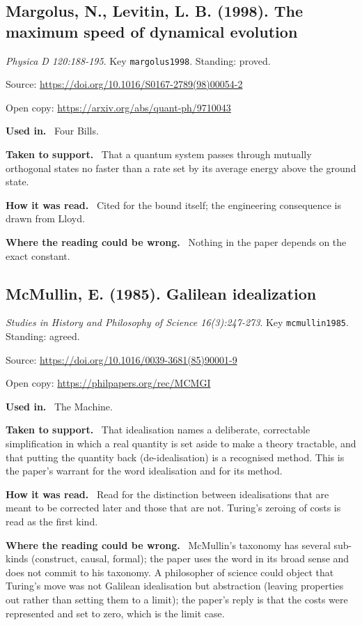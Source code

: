 \documentclass[11pt,oneside]{article}
\newcommand{\field}[1]{\par\noindent\textbf{\color{accent}#1.}\ }
\begin{document}
\subsection*{Margolus, N., Levitin, L. B. (1998). The maximum speed of dynamical evolution}
\noindent\small\emph{Physica D 120:188-195}. Key \texttt{margolus1998}. Standing: proved.
\par\noindent\small Source: \url{https://doi.org/10.1016/S0167-2789(98)00054-2}
\par\noindent\small Open copy: \url{https://arxiv.org/abs/quant-ph/9710043}
\normalsize
\field{Used in} Four Bills.
\field{Taken to support} That a quantum system passes through mutually orthogonal states no faster than a rate set by its average energy above the ground state.
\field{How it was read} Cited for the bound itself; the engineering consequence is drawn from Lloyd.
\field{Where the reading could be wrong} Nothing in the paper depends on the exact constant.

\hypertarget{src:mcmullin1985}{}
\subsection*{McMullin, E. (1985). Galilean idealization}
\noindent\small\emph{Studies in History and Philosophy of Science 16(3):247-273}. Key \texttt{mcmullin1985}. Standing: agreed.
\par\noindent\small Source: \url{https://doi.org/10.1016/0039-3681(85)90001-9}
\par\noindent\small Open copy: \url{https://philpapers.org/rec/MCMGI}
\normalsize
\field{Used in} The Machine.
\field{Taken to support} That idealisation names a deliberate, correctable simplification in which a real quantity is set aside to make a theory tractable, and that putting the quantity back (de-idealisation) is a recognised method. This is the paper's warrant for the word idealisation and for its method.
\field{How it was read} Read for the distinction between idealisations that are meant to be corrected later and those that are not. Turing's zeroing of costs is read as the first kind.
\field{Where the reading could be wrong} McMullin's taxonomy has several sub-kinds (construct, causal, formal); the paper uses the word in its broad sense and does not commit to his taxonomy. A philosopher of science could object that Turing's move was not Galilean idealisation but abstraction (leaving properties out rather than setting them to a limit); the paper's reply is that the costs were represented and set to zero, which is the limit case.
\end{document}
